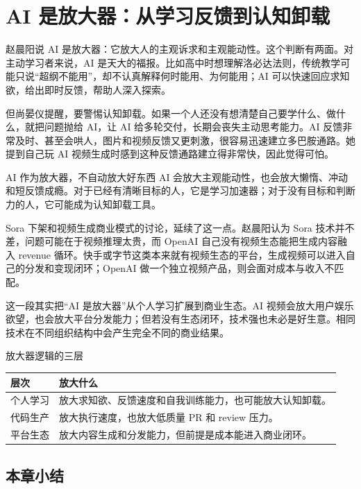 \documentclass[a4paper]{article}
\begin{document}
\section{AI 是放大器：从学习反馈到认知卸载}

赵晨阳说 AI 是放大器：它放大人的主观诉求和主观能动性。这个判断有两面。对主动学习者来说，AI 是天大的福报。比如高中时想理解洛必达法则，传统教学可能只说“超纲不能用”，却不认真解释何时能用、为何能用；AI 可以快速回应求知欲，给出即时反馈，帮助人深入探索。

但尚晏仪提醒，要警惕认知卸载。如果一个人还没有想清楚自己要学什么、做什么，就把问题抛给 AI，让 AI 给多轮交付，长期会丧失主动思考能力。AI 反馈非常及时、甚至会哄人，图片和视频反馈又更刺激，很容易迅速建立多巴胺通路。她提到自己玩 AI 视频生成时感到这种反馈通路建立得非常快，因此觉得可怕。

\begin{warningbox}{AI 作为放大器，不自动放大好东西}
AI 会放大主观能动性，也会放大懒惰、冲动和短反馈成瘾。对于已经有清晰目标的人，它是学习加速器；对于没有目标和判断力的人，它可能成为认知卸载工具。
\end{warningbox}

Sora 下架和视频生成商业模式的讨论，延续了这一点。赵晨阳认为 Sora 技术并不差，问题可能在于视频推理太贵，而 OpenAI 自己没有视频生态能把生成内容融入 revenue 循环。快手或字节这类本来就有视频生态的平台，生成视频可以进入自己的分发和变现闭环；OpenAI 做一个独立视频产品，则会面对成本与收入不匹配。

这一段其实把“AI 是放大器”从个人学习扩展到商业生态。AI 视频会放大用户娱乐欲望，也会放大平台分发能力；但若没有生态闭环，技术强也未必是好生意。相同技术在不同组织结构中会产生完全不同的商业结果。

\begin{knowledgebox}{放大器逻辑的三层}
\begin{tabularx}{\textwidth}{>{\raggedright\arraybackslash}p{} Y}
\toprule
层次 & 放大什么 \\
\midrule
个人学习 & 放大求知欲、反馈速度和自我训练能力，也可能放大认知卸载。 \\
代码生产 & 放大执行速度，也放大低质量 PR 和 review 压力。 \\
平台生态 & 放大内容生成和分发能力，但前提是成本能进入商业闭环。 \\
\bottomrule
\end{tabularx}
\end{knowledgebox}

\subsection{本章小结}
\end{document}
